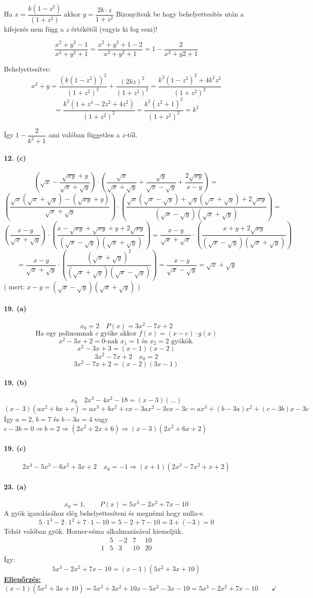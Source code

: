\documentclass[12pt,a4paper,fleqn]{article}
\newcommand{\myparagraph}[1]{\paragraph{#1}\mbox{}}
\begin{document}
Ha $x = \dfrac{k(1-z^2)}{(1+z^2)}$ akkor $y = \dfrac{2k \cdot z}{1+z^2}$
Bizonyítsuk be hogy behelyettesítés után a kifejezés nem függ a $z$ értékétől
(vagyis ki fog esni)!

\[ \dfrac{x^2+y^2-1}{x^2+y^2+1} = \dfrac{x^2+y^2+1-2}{x^2+y^2+1} =
  1 - \dfrac{2}{x^2+y2+1} \]

Behelyettesítve:
\[ x^2+y=\dfrac{(k(1-z^2))^2}{(1+z^2)^2} + \dfrac{(2kz)^2}{(1+z^2)^2} =
  \dfrac{k^2(1-z^2)^2+4k^2z^2}{(1+z^2)^2} \]
\[ = \dfrac{k^2(1+z^4-2z^2+4z^2)}{(1+z^2)^2} = \dfrac{k^2(z^2+1)^2}{(1+z^2)^2} = k^2 \]

Így $1-\dfrac{2}{k^2+1}$ ami valóban független a $z$-től.


\myparagraph{12. (c)}
\[ \left(\sqrt{x} - \dfrac{\sqrt{xy}+y}{\sqrt{x}+\sqrt{y}}\right) \cdot
  \left( \dfrac{\sqrt{x}}{\sqrt{x}+\sqrt{y}} + \dfrac{\sqrt{y}}{\sqrt{x}-\sqrt{y}} +
  \dfrac{2\sqrt{xy}}{x-y} \right) = \]
\[
  \left(\dfrac{\sqrt{x}(\sqrt{x}+\sqrt{y})-(\sqrt{xy}+y)}{\sqrt{x} + \sqrt{y}} \right) \cdot
  \left( \dfrac{\sqrt{x}(\sqrt{x}-\sqrt{y})+\sqrt{y}(\sqrt{x}+\sqrt{y})+
  2\sqrt{xy}}{(\sqrt{x}-\sqrt{y})(\sqrt{x}+\sqrt{y})} \right) =
\]
\[ \left( \dfrac{x-y}{\sqrt{x}+\sqrt{y}} \right) \cdot \left(
  \dfrac{x-\sqrt{xy}+\sqrt{xy}+y+2\sqrt{xy}}{(\sqrt{x}-\sqrt{y})(\sqrt{x}+\sqrt{y})} \right) =
  \dfrac{x-y}{\sqrt{x}+\sqrt{x}} \cdot \left( \dfrac{x+y+2\sqrt{xy}}{(\sqrt{x}-
  \sqrt{y})(\sqrt{x}+\sqrt{y})} \right) \]
\[ = \dfrac{x-y}{\sqrt{x}+\sqrt{y}} \cdot \left(
  \dfrac{(\sqrt{x}+\sqrt{y})^2}{(\sqrt{x}+\sqrt{y})(\sqrt{x}-\sqrt{y})} \right) =
  \dfrac{x-y}{\sqrt{x} - \sqrt{y}} = \sqrt{x} + \sqrt{y} \]
( mert: $x-y=(\sqrt{x}-\sqrt{y})(\sqrt{x}+\sqrt{y})$ )


\myparagraph{19. (a)}
\[ x_0 = 2 \quad P(x)=3x^2 - 7x + 2 \]
\[ \text{Ha egy polinomnak } c \text{ gyöke akkor } f(x)=(x-c) \cdot g(x) \]
\[ x^2-3x+2=0\text{-nak } x_1=1 \text{ és } x_2=2 \text{ gyökök.} \]
\[ x^2-3x+3=(x-1)(x-2) \]
\[ 3x^2-7x+2 \quad x_0=2 \]
\[ 3x^2-7x+2=(x-2)(3x-1) \]


\myparagraph{19. (b)}
\[ x_0 \quad 2x^3-4x^2-18 = (x-3)(...) \]
\[ (x-3)(ax^2+bx+c) = ax^3+bx^2+cx-3ax^2-3vx-3c = ax^3+(b-3a)x^2+(c-3b)x-3c \]
Így $a=2$, $b=7$ és $b-3a=4$ vagy $c-3b=0 \Rightarrow b=2 \Longrightarrow
  (2x^2+2x+6) \Rightarrow (x-3)(2x^2+6x+2)$


\myparagraph{19. (c)}
\[ 2x^4-5x^3-6x^2+3x+2 \quad x_0=-1 \Longrightarrow (x+1)(2x^3-7x^2+x+2) \]


\myparagraph{23. (a)}
\[ x_0 = 1, \qquad P(x) = 5x^3 - 2x^2 + 7x -10 \]
A gyök igazolásához elég behelyettesíteni és megnézni hogy nulla-e.
\[ 5 \cdot 1^3 - 2 \cdot 1^2 + 7 \cdot 1 -10  = 5 - 2 + 7 - 10 = 3 + (-3) = 0 \]
Tehát valóban gyök. Horner-séma alkalmazásával kiemeljük.
\[
  \begin{array}{c|cccc}
    & 5 & -2 &  7 & 10 \\ \hline
  1 &  5 & 3 &  10 & 20 \\
 \end{array}
\]
Így:
\[
  5x^3 - 2x^2 + 7x -10=(x-1)(5x^2+3x+10)
\]
\underline{\textbf{Ellenőrzés:}}
\[
  (x-1)(5x^2+3x+10) = 5x^3 + 3x^2 + 10x - 5x^2 - 3x -10 = 5x^3-2x^2+7x-10
  \qquad \checkmark
\]
\end{document}
